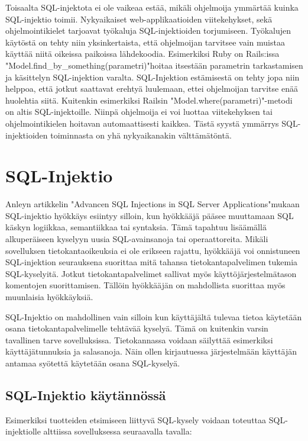 \documentclass[finnish]{tktltiki2}
\theoremstyle{definition}
\theoremstyle{remark}
\begin{document}
	Toisaalta SQL-injektota ei ole vaikeaa estää, mikäli ohjelmoija ymmärtää kuinka SQL-injektio toimii. Nykyaikaiset web-applikaatioiden viitekehykset, sekä ohjelmointikielet tarjoavat työkaluja SQL-injektioiden torjumiseen. Työkalujen käytöstä on tehty niin yksinkertaista, että ohjelmoijan tarvitsee vain muistaa käyttää niitä oikeissa paikoissa lähdekoodia. Esimerkiksi Ruby on Rails:issa  "Model.find\_by\_something(parametri)"\space hoitaa itsestään parametrin tarkastamisen ja käsittelyn SQL-injektion varalta. SQL-Injektion estämisestä on tehty jopa niin helppoa, että jotkut saattavat erehtyä luulemaan, ettei ohjelmoijan tarvitse enää huolehtia siitä. Kuitenkin esimerkiksi Railsin "Model.where(parametri)"\space -metodi on altis SQL-injektoille. Niinpä ohjelmoija ei voi luottaa viitekehyksen tai ohjelmointikielen hoitavan automaattisesti kaikkea. Tästä syystä ymmärrys SQL-injektioiden toiminnasta on yhä nykyaikanakin välttämätöntä.  
	
	
	\section{SQL-Injektio}
	Anleyn artikkelin "Advancen SQL Injections in SQL Server Applications"\space\cite{definition}\space mukaan SQL-injektio hyökkäys esiintyy silloin, kun hyökkääjä pääsee muuttamaan SQL käskyn logiikkaa, semantiikkaa tai syntaksia. Tämä tapahtuu lisäämällä alkuperäiseen kyselyyn uusia SQL-avainsanoja tai operaattoreita.
	Mikäli sovelluksen tietokantaoikeuksia ei ole erikseen rajattu, hyökkääjä voi onnistuneen SQL-injektion seurauksena suorittaa mitä tahansa tietokantapalvelimen tukemia SQL-kyselyitä. Jotkut tietokantapalvelimet sallivat myös käyttöjärjestelmätason komentojen suorittamisen. Tällöin hyökkääjän on mahdollista suorittaa myös muunlaisia hyökkäyksiä. 
	
	SQL-Injektio on mahdollinen vain silloin kun käyttäjältä tulevaa tietoa käytetään osana tietokantapalvelimelle tehtävää kyselyä. Tämä on kuitenkin varsin tavallinen tarve sovelluksissa. Tietokannassa voidaan säilyttää esimerkiksi käyttäjätunnuksia ja salasanoja. Näin ollen kirjautuessa järjestelmään käyttäjän antamaa syötettä käytetään osana SQL-kyselyä.
	
	\subsection{SQL-Injektio käytännössä}
	
 Esimerkiksi tuotteiden etsimiseen liittyvä SQL-kysely voidaan toteuttaa SQL-injektiolle alttiissa sovelluksessa seuraavalla tavalla:
 
\end{document}
